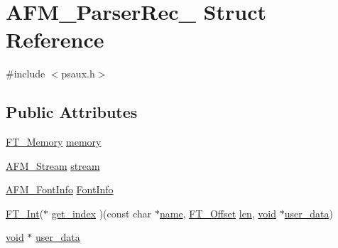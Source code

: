 \hypertarget{struct_a_f_m___parser_rec__}{\section{A\-F\-M\-\_\-\-Parser\-Rec\-\_\- Struct Reference}
\label{struct_a_f_m___parser_rec__}
}


{\ttfamily \#include $<$psaux.\-h$>$}

\subsection*{Public Attributes}
\begin{DoxyCompactItemize}
\item 
\hyperlink{ftsystem_8h_a67ec7ea35cde99a89a65e9f827a9ad3a}{F\-T\-\_\-\-Memory} \hyperlink{struct_a_f_m___parser_rec___a3fec8b1760fa9261f48ee87dc2b3858b}{memory}
\item 
\hyperlink{psaux_8h_af4e38d53e29cf02398d053dc7e26fa68}{A\-F\-M\-\_\-\-Stream} \hyperlink{struct_a_f_m___parser_rec___adf3b1165216cbd1f7ec7ae736fd4270a}{stream}
\item 
\hyperlink{t1types_8h_a777f9b8cdbac8c166fa6f1637d08c339}{A\-F\-M\-\_\-\-Font\-Info} \hyperlink{struct_a_f_m___parser_rec___ae53d6cddac32a0eb7014c3a9f74517df}{Font\-Info}
\item 
\hyperlink{fttypes_8h_af90e5fb0d07e21be9fe6faa33f02484c}{F\-T\-\_\-\-Int}($\ast$ \hyperlink{struct_a_f_m___parser_rec___a5f93c5c83d0957c19d3827071d90926f}{get\-\_\-index} )(const char $\ast$\hyperlink{fmod__codec_8h_a5c4947d4516dd7cfa3505ce3a648a4ef}{name}, \hyperlink{fttypes_8h_af7b5edd727ac01b0d4729ac848bd4175}{F\-T\-\_\-\-Offset} \hyperlink{glew_8h_a652168017ea9a8bbcead03d5c16269fb}{len}, \hyperlink{wglew_8h_aeea6e3dfae3acf232096f57d2d57f084}{void} $\ast$\hyperlink{struct_a_f_m___parser_rec___a9fa78a781737bf27e00448c5092b7657}{user\-\_\-data})
\item 
\hyperlink{wglew_8h_aeea6e3dfae3acf232096f57d2d57f084}{void} $\ast$ \hyperlink{struct_a_f_m___parser_rec___a9fa78a781737bf27e00448c5092b7657}{user\-\_\-data}
\end{DoxyCompactItemize}


